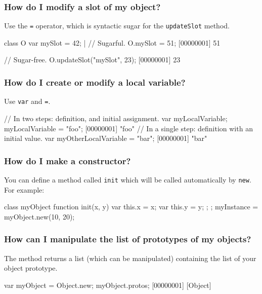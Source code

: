 \subsubsection{How do I modify a slot of my object?}
Use the \lstinline|=| operator, which is syntactic sugar for the
\lstinline|updateSlot| method.

\begin{urbiscript}
class O
{
  var mySlot = 42;
}|
// Sugarful.
O.mySlot = 51;
[00000001] 51

// Sugar-free.
O.updateSlot("mySlot", 23);
[00000001] 23
\end{urbiscript}

\subsubsection{How do I create or modify a local variable?}
Use \lstinline|var| and \lstinline|=|.

\begin{urbiscript}
// In two steps: definition, and initial assignment.
var myLocalVariable;
myLocalVariable = "foo";
[00000001] "foo"
// In a single step: definition with an initial value.
var myOtherLocalVariable = "bar";
[00000001] "bar"
\end{urbiscript}


\subsubsection{How do I make a constructor?}
You can define a method called \lstinline{init} which will be called
automatically by \lstinline{new}. For example:

\begin{urbiunchecked}
class myObject
{
  function init(x, y)
  {
    var this.x = x;
    var this.y = y;
  };
};
myInstance = myObject.new(10, 20);
\end{urbiunchecked}


\subsubsection{How can I manipulate the list of prototypes of my objects?}
The  method returns a list (which can be manipulated)
containing the list of your object prototype.

\begin{urbiunchecked}
var myObject = Object.new;
myObject.protos;
[00000001] [Object]
\end{urbiunchecked}


